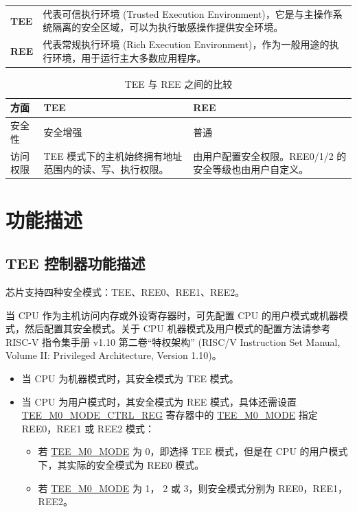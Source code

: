 \documentclass[main\_\_CN.tex]{subfiles}
\begin{document}
\begin{longtable}[L]{ R{2cm} p{13cm} }

\textbf{TEE} & 代表可信执行环境 (Trusted Execution Environment)，它是与主操作系统隔离的安全区域，可以为执行敏感操作提供安全环境。\\

\textbf{REE} & 代表常规执行环境 (Rich Execution Environment)，作为一般用途的执行环境，用于运行主大多数应用程序。
\end{longtable}

\begin{longtable}{|L{3cm}|L{6cm}|L{6cm}|}
    \caption{TEE 与 REE 之间的比较}
    \label{tab:tee-ree-comparison}\\
\hline{}
\textbf{方面} & \textbf{TEE} & \textbf{REE} \\
\hline
安全性 & 安全增强 & 普通 \\
\hline
访问权限 & TEE 模式下的主机始终拥有地址范围内的读、写、执行权限。 & 由用户配置安全权限。REE0/1/2 的安全等级也由用户自定义。\\
\hline
\end{longtable}

\section{功能描述}

\subsection{TEE 控制器功能描述}

\chipname{} 芯片支持四种安全模式：TEE、REE0、REE1、REE2。

当 CPU 作为主机访问内存或外设寄存器时，可先配置 CPU 的用户模式或机器模式，然后配置其安全模式。关于 CPU 机器模式及用户模式的配置方法请参考 RISC-V 指令集手册 v1.10 第二卷“特权架构” (RISC\-/V Instruction Set Manual, Volume II: Privileged Architecture, Version 1.10)。
\begin{itemize}
    \item 当 CPU 为机器模式时，其安全模式为 TEE 模式。
    \item 当 CPU 为用户模式时，其安全模式为 REE 模式，具体还需设置 \hyperref[regdesc:TEEM0MODECTRLREG]{TEE\_M0\_MODE\_CTRL\_REG} 寄存器中的 \hyperref[fielddesc:TEEM0MODE]{TEE\_M0\_MODE} 指定 REE0，REE1 或 REE2 模式：
    \begin{itemize}
        \item 若 \hyperref[fielddesc:TEEM0MODE]{TEE\_M0\_MODE} 为 0，即选择 TEE 模式，但是在 CPU 的用户模式下，其实际的安全模式为 REE0 模式。
        \item 若 \hyperref[fielddesc:TEEM0MODE]{TEE\_M0\_MODE} 为 1， 2 或 3，则安全模式分别为 REE0，REE1，REE2。
    \end{itemize}
\end{itemize}
\end{document}
